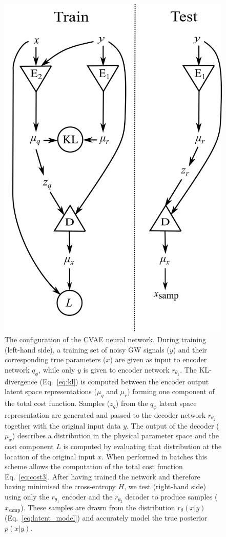 \begin{figure}
    \includegraphics[width=0.75\columnwidth]{network_setup.png}
    \caption{\label{fig:network_config} 
    The configuration of the \ac{CVAE}
neural network. During training (left-hand side), a training set of noisy
\ac{GW} signals ($y$) and their corresponding true parameters ($x$) are given
as input to encoder network $q_{\phi}$, while only $y$ is given to
encoder network $r_{\theta_1}$. The \ac{KL}-divergence (Eq.~\ref{eq:kl})
is computed between the encoder output latent space representations
($\mu_q$ and $\mu_r$) forming one component of the total cost function. Samples
($z_q$) from the $q_{\phi}$ latent space representation are generated and
passed to the decoder network $r_{\theta_2}$ together with the original
input data $y$. The output of the decoder ($\mu_x$) describes a distribution in
the physical parameter space and the cost component $L$ is computed by
evaluating that distribution at the location of the original input $x$.
When performed in batches this scheme allows the computation of the total cost
function Eq.~\ref{eq:cost3}. After having trained the network and
therefore having minimised the cross-entropy $H$, we test (right-hand side)
using only the $r_{\theta_1}$ encoder and the $r_{\theta_2}$
decoder to produce samples ($x_{\text{samp}}$). These samples are drawn
from the distribution $r_{\theta}(x|y)$ (Eq.~\ref{eq:latent_model})
and accurately model the true posterior $p(x|y)$.}
\end{figure}



